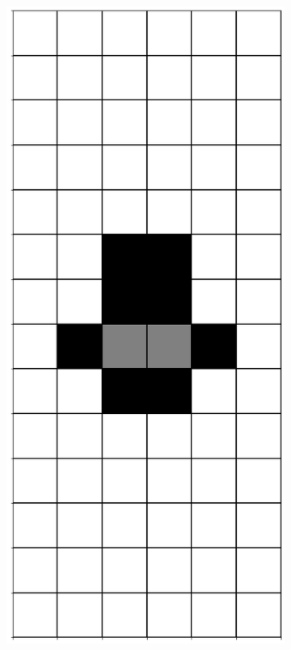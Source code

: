 \documentclass[12pt]{article}
\numberwithin{figure}{section} %
\begin{document}
\begin{figure}[H]
\begin{subfigure}{0.18\textwidth}
     	\includegraphics[width=\linewidth]{Section4/34.0}

\end{subfigure}
\end{figure}
\end{document}
